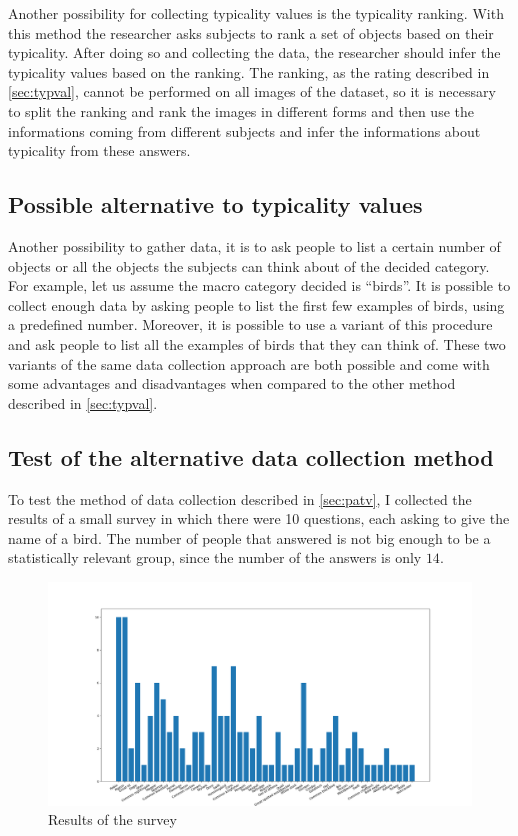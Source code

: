 \documentclass[conference]{IEEEtran}
\begin{document}
			\noindent Another possibility for collecting typicality values is the typicality ranking. With this method the researcher asks subjects to rank a set of objects based on their typicality. After doing so 
			and collecting the data, the researcher should infer the typicality values based on the ranking. The ranking, as the rating described in \ref{sec:typval}, cannot be performed on all images of the dataset, 
			so it is necessary to split the ranking and rank the images in different forms and then use the informations coming from different subjects and infer the informations about typicality from these answers.
			
		\subsection{Possible alternative to typicality values\label{sec:patv}}
		
			\noindent Another possibility to gather data, it is to ask people to list a certain number of objects or all the objects the subjects can think about of the decided category. For example, let us assume the macro category decided 
			is ``birds''. It is possible to collect enough data by asking people to list the first few examples of birds, using a predefined number. Moreover, it is possible to use a variant of this procedure and ask people 
			to list all the examples of birds that they can think of. These two variants of the same data collection approach are both possible and come with some advantages and disadvantages when compared to the other 
			method described in \ref{sec:typval}. 
			
		\subsection{Test of the alternative data collection method}
	
			\noindent To test the method of data collection described in \ref{sec:patv}, I collected the results of a small survey in which there were 10 questions, each asking to give the name of a bird. The number of 
			people that answered is not big enough to be a statistically relevant group, since the number of the answers is only $14$.
	
		\begin{figure}
			\centerline{\includegraphics[width=\linewidth]{imgs/survey_hist.png}}
			\caption{Results of the survey}
			\label{fig:7}
		\end{figure}
		
\end{document}
